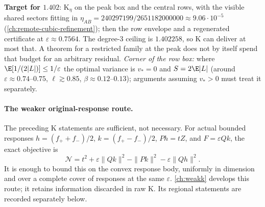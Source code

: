 \textbf{Target for $1.402$}: K$_\eta$ on the peak box and the central rows, with the visible shared sectors fitting in
$\eta_{AB}=240297199/2651182000000\approx9.06\cdot10^{-5}$ (\autoref{ch:remote-cubic-refinement}); then the row envelope and a regenerated certificate at
$\varepsilon\approx0.7564$. The degree-3 ceiling is $1.402258$, so K can deliver at most that. A theorem for a restricted family at the peak does not by itself spend that
budget for an arbitrary residual. \emph{Corner of the row box:} where $\E[1/(2|L|)]\le1/\varepsilon$ the optimal variance is $v_*=0$ and $S=2\E|L|$ (around
$\varepsilon\approx0.74$--$0.75$, $\ell\gtrsim0.85$, $\beta\approx0.12$--$0.13$); arguments assuming $v_*>0$ must treat it separately.

\paragraph{The weaker original-response route.}
The preceding K statements are sufficient, not necessary. For actual bounded
responses $h=(f_++f_-)/2$, $k=(f_+-f_-)/2$, $Ph=tZ$, and
$F=\varepsilon Qk$, the exact objective is
\[
 \mathcal N=t^2+\varepsilon\|Qk\|^2-\|Pk\|^2-\varepsilon\|Qh\|^2.
\]
It is enough to bound this on the convex response body, uniformly in dimension
and over a complete cover of responses at the same $\varepsilon$.
\autoref{ch:weakk} develops this route; it retains information discarded
in raw K. Its regional statements are recorded separately below.

